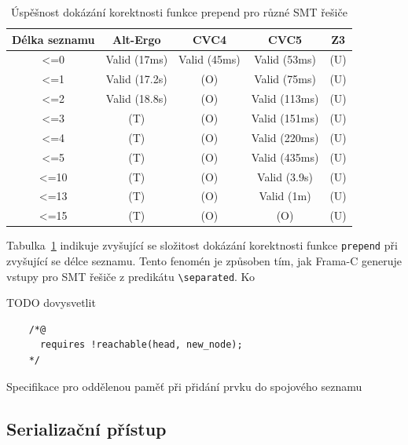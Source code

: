 \begin{table}[H]
    \centering
    \begin{tabular}{|c|c|c|c|c|}
        \hline
        Délka seznamu & Alt-Ergo & CVC4 & CVC5 & Z3 \\
        \hline
        <=0  & Valid (17ms)  & Valid (45ms) & Valid (53ms)  & (U) \\
        <=1  & Valid (17.2s) & (O)          & Valid (75ms)  & (U) \\
        <=2  & Valid (18.8s) & (O)          & Valid (113ms) & (U) \\
        <=3  & (T)           & (O)          & Valid (151ms) & (U) \\
        <=4  & (T)           & (O)          & Valid (220ms) & (U) \\
        <=5  & (T)           & (O)          & Valid (435ms) & (U) \\
        <=10 & (T)           & (O)          & Valid (3.9s)  & (U) \\
        <=13 & (T)           & (O)          & Valid (1m)    & (U) \\
        <=15 & (T)           & (O)          & (O)           & (U) \\
        \hline
    \end{tabular}
    \caption{Úspěšnost dokázání korektnosti funkce prepend pro různé SMT řešiče}
    \label{tab:prepend-smt-success}
\end{table}

Tabulka~\ref{tab:prepend-smt-success} indikuje zvyšující se složitost dokázání korektnosti funkce \texttt{prepend}
při zvyšující se délce seznamu.
Tento fenomén je způsoben tím, jak Frama\mbox{-}C generuje vstupy pro SMT řešiče z predikátu \texttt{\textbackslash separated}.
Ko

TODO dovysvetlit

\begin{listing}[H]
    \begin{verbatim}
    /*@
      requires !reachable(head, new_node);
    */
    \end{verbatim}
    \caption{Specifikace pro oddělenou paměť při přidání prvku do spojového seznamu}
    \label{list:linked-list-axiom-prepend}
\end{listing}


\subsection{Serializační přístup}
\label{subsec:serializacni-pristup}

